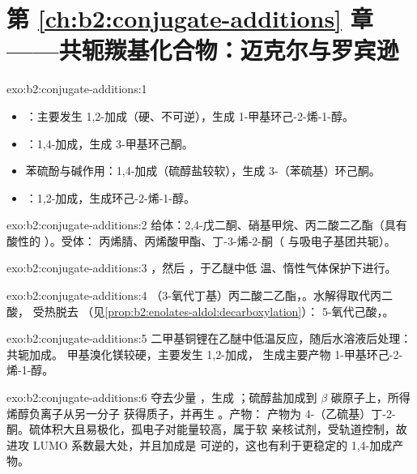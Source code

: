 \section*{第 \ref{ch:b2:conjugate-additions} 章——共轭羰基化合物：迈克尔与罗宾逊}

\begin{solution}{exo:b2:conjugate-additions:1}
\begin{itemize}
  \item {}：主要发生 1,2-加成（硬、不可逆），生成 1-甲基环己-2-烯-1-醇。
  \item {}：1,4-加成，生成 3-甲基环己酮。
  \item 苯硫酚与碱作用：1,4-加成（硫醇盐较软），生成 3-（苯硫基）环己酮。
  \item {}：1,2-加成，生成环己-2-烯-1-醇。
\end{itemize}
\end{solution}

\begin{solution}{exo:b2:conjugate-additions:2}
给体：2,4-戊二酮、硝基甲烷、丙二酸二乙酯（具有酸性的 ）。受体：
丙烯腈、丙烯酸甲酯、丁-3-烯-2-酮（ 与吸电子基团共轭）。
\end{solution}

\begin{solution}{exo:b2:conjugate-additions:3}
，然后 ，于乙醚中低
温、惰性气体保护下进行。
\end{solution}

\begin{solution}{exo:b2:conjugate-additions:4}
（3-氧代丁基）丙二酸二乙酯，。水解得取代丙二酸，
受热脱去 （见\cref{prop:b2:enolates-aldol:decarboxylation}）：
5-氧代己酸，。
\end{solution}

\begin{solution}{exo:b2:conjugate-additions:5}
二甲基铜锂在乙醚中低温反应，随后水溶液后处理：共轭加成。
甲基溴化镁较硬，主要发生 1,2-加成，
生成主要产物 1-甲基环己-2-烯-1-醇。
\end{solution}

\begin{solution}{exo:b2:conjugate-additions:6}
 夺去少量 ，生成 ；硫醇盐加成到 $\beta$ 碳原子上，所得
烯醇负离子从另一分子  获得质子，并再生 。产物：
产物为 4-（乙硫基）丁-2-酮。硫体积大且易极化，孤电子对能量较高，属于软
亲核试剂，受轨道控制，故进攻 LUMO 系数最大处，并且加成是
可逆的，这也有利于更稳定的 1,4-加成产物。
\end{solution}

